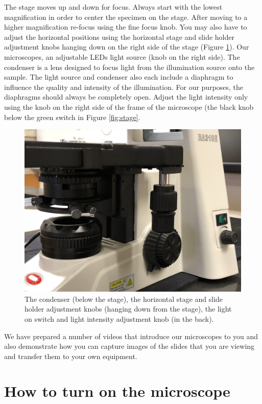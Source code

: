 The stage moves up and down for focus. Always start with the lowest magnification in order to center the specimen on the stage. After moving to a higher magnification re-focus using the fine focus knob. You may also have to adjust the horizontal positions using the horizontal stage and slide holder adjustment knobs hanging down on the right side of the stage (Figure \ref{fig:condenser}). Our microscopes, an adjustable LEDs light source (knob on the right side). The condenser is a lens designed to focus light from the illumination source onto the sample. The light source and condenser also each include a diaphragm to influence the quality and intensity of the illumination. For our purposes, the diaphragms should always be completely open. Adjust the light intensity only using the knob on the right side of the frame of the microscope (the black knob below the green switch in Figure \ref{fig:stage}.

\begin{figure}

{\centering \includegraphics[width=0.7\linewidth]{./figures/microscope/condenser} 

}

\caption{The condenser (below the stage), the horizontal stage and slide holder adjustment knobs (hanging down from the stage), the light on switch and light intensity adjustment knob (in the back).}\label{fig:condenser}
\end{figure}

We have prepared a number of videos that introduce our microscopes to you and also demonstrate how you can capture images of the slides that you are viewing and transfer them to your own equipment.

\hypertarget{how-to-turn-on-the-microscope}{%
\section{How to turn on the microscope}\label{how-to-turn-on-the-microscope}}

